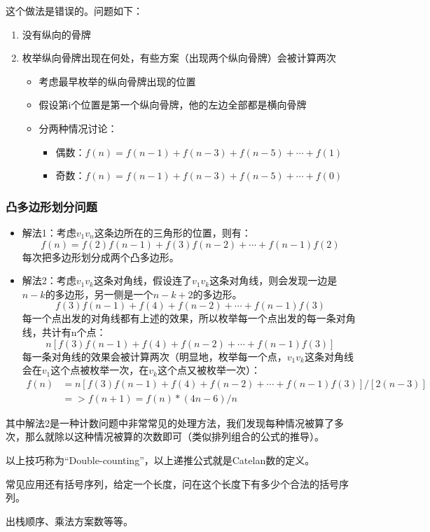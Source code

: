 \documentclass{article}
\begin{document}
这个做法是错误的。问题如下：
\begin{enumerate}
  \item{没有纵向的骨牌}
  \item{枚举纵向骨牌出现在何处，有些方案（出现两个纵向骨牌）会被计算两次}
  \begin{itemize}
    \item{考虑最早枚举的纵向骨牌出现的位置}
    \item{假设第i个位置是第一个纵向骨牌，他的左边全部都是横向骨牌}
    \item{分两种情况讨论：}
    \begin{itemize}
      \item{偶数：$f(n)=f(n-1)+f(n-3)+f(n-5)+\cdots+f(1)$}
      \item{奇数：$f(n)=f(n-1)+f(n-3)+f(n-5)+\cdots+f(0)$}
    \end{itemize}
  \end{itemize}
\end{enumerate}
\subsubsection{凸多边形划分问题}
\begin{itemize}
    \item{解法1：考虑$v_1v_n$这条边所在的三角形的位置，则有：
    \begin{equation*}
      f(n)=f(2)f(n-1)+f(3)f(n-2)+\cdots+f(n-1)f(2)
    \end{equation*}
    每次把多边形划分成两个凸多边形。}
    \item{解法2：考虑$v_1v_k$这条对角线，假设连了$v_1v_k$这条对角线，则会发现一边是$n-k$的多边形，另一侧是一个$n-k+2$的多边形。
    \begin{equation*}
      f(3)f(n-1)+f(4)+f(n-2)+\cdots+f(n-1)f(3)
    \end{equation*}
    每一个点出发的对角线都有上述的效果，所以枚举每一个点出发的每一条对角线，共计有n个点：
    \begin{equation*}
      n[f(3)f(n-1)+f(4)+f(n-2)+\cdots+f(n-1)f(3)]
    \end{equation*}
    每一条对角线的效果会被计算两次（明显地，枚举每一个点，$v_1v_k$这条对角线会在$v_1$这个点被枚举一次，在$v_k$这个点又被枚举一次）：
    \begin{equation*}
      \begin{aligned}
        f(n)&=n[f(3)f(n-1)+f(4)+f(n-2)+\cdots+f(n-1)f(3)]/[2(n-3)]\\
        &=>f(n+1)=f(n)*(4n-6)/n
      \end{aligned}
    \end{equation*}
    }
\end{itemize}
其中解法2是一种计数问题中非常常见的处理方法，我们发现每种情况被算了多次，那么就除以这种情况被算的次数即可（类似排列组合的公式的推导）。

以上技巧称为``Double-counting''，以上递推公式就是Catelan数的定义。

常见应用还有括号序列，给定一个长度，问在这个长度下有多少个合法的括号序列。

出栈顺序、乘法方案数等等。
\end{document}
